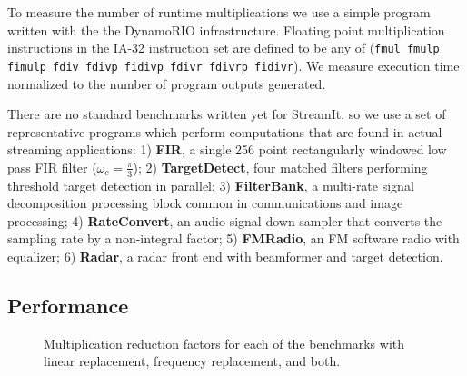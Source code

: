 To measure the number of runtime multiplications we use a simple program written with the 
the DynamoRIO\cite{dynamo99} infrastructure. Floating point multiplication instructions 
in the IA-32 instruction set are defined to be any of ({\tt fmul fmulp fimulp fdiv fdivp fidivp fdivr fdivrp fidivr}).
We measure execution time normalized to the number of program outputs generated.

There are no standard benchmarks written yet for StreamIt, so we use a
set of representative programs which perform computations that are
found in actual streaming applications: 1) {\bf FIR}, a single 256
point rectangularly windowed low pass FIR filter
($\omega_c=\frac{\pi}{3}$); 2) {\bf TargetDetect}, four matched
filters performing threshold target detection in parallel; 3) {\bf
FilterBank}, a multi-rate signal decomposition processing block common
in communications and image processing; 4) {\bf RateConvert}, an audio
signal down sampler that converts the sampling rate by a non-integral
factor; 5) {\bf FMRadio}, an FM software radio with equalizer; 6) {\bf
Radar}, a radar front end with beamformer and target detection.

\subsection{Performance}



\begin{figure}
\center
\epsfxsize=3.2in
\vspace{-6pt}
\caption{Multiplication reduction factors for each of the benchmarks with linear replacement, frequency replacement, and both.}
\label{fig:linear-freq-both}
\vspace{-12pt}
\end{figure}

